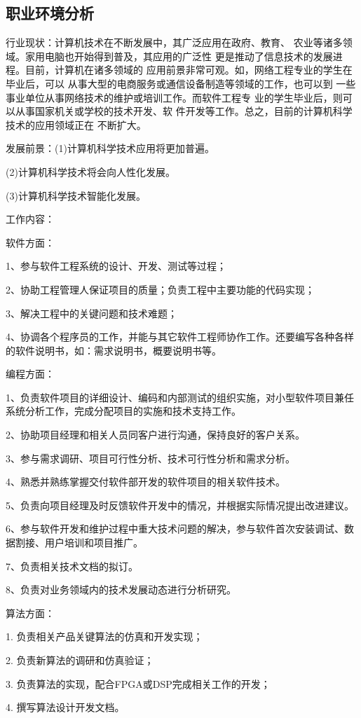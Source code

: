 \documentclass{article}
\begin{document}
\subsection{职业环境分析}
\par
行业现状：计算机技术在不断发展中，其广泛应用在政府、教育、 农业等诸多领域。家用电脑也开始得到普及，其应用的广泛性 更是推动了信息技术的发展进程。目前，计算机在诸多领域的 应用前景非常可观。如，网络工程专业的学生在毕业后，可以 从事大型的电商服务或通信设备制造等领域的工作，也可以到 一些事业单位从事网络技术的维护或培训工作。而软件工程专 业的学生毕业后，则可以从事国家机关或学校的技术开发、软 件开发等工作。总之，目前的计算机科学技术的应用领域正在 不断扩大。\par
发展前景：(1)计算机科学技术应用将更加普遍。\par
(2)计算机科学技术将会向人性化发展。\par
(3)计算机科学技术智能化发展。\par
工作内容：\par
软件方面：\par 
1、参与软件工程系统的设计、开发、测试等过程；\par
2、协助工程管理人保证项目的质量；负责工程中主要功能的代码实现；\par
3、解决工程中的关键问题和技术难题；\par
4、协调各个程序员的工作，并能与其它软件工程师协作工作。还要编写各种各样的软件说明书，如：需求说明书，概要说明书等。
\par
编程方面：\par
1、负责软件项目的详细设计、编码和内部测试的组织实施，对小型软件项目兼任系统分析工作，完成分配项目的实施和技术支持工作。\par
2、协助项目经理和相关人员同客户进行沟通，保持良好的客户关系。\par
3、参与需求调研、项目可行性分析、技术可行性分析和需求分析。\par
4、熟悉并熟练掌握交付软件部开发的软件项目的相关软件技术。
\par
5、负责向项目经理及时反馈软件开发中的情况，并根据实际情况提出改进建议。\par
6、参与软件开发和维护过程中重大技术问题的解决，参与软件首次安装调试、数据割接、用户培训和项目推广。\par
7、负责相关技术文档的拟订。\par
8、负责对业务领域内的技术发展动态进行分析研究。\par
算法方面：\par
1.     负责相关产品关键算法的仿真和开发实现；\par
2.     负责新算法的调研和仿真验证；\par
3.     负责算法的实现，配合FPGA或DSP完成相关工作的开发；\par
4.     撰写算法设计开发文档。\par
\end{document}
